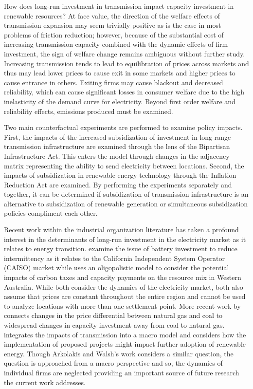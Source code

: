 \documentclass[12pt]{article}
\begin{document}
How does long-run investment in transmission impact capacity investment in renewable resources? At face value, the direction of the welfare effects of transmission expansion may seem trivially positive as is the case in most problems of friction reduction; however, because of the substantial cost of increasing transmission capacity combined with the dynamic effects of firm investment, the sign of welfare change remains ambiguous without further study. Increasing transmission tends to lead to equilibration of prices across markets and thus may lead lower prices to cause exit in some markets and higher prices to cause entrance in others. Exiting firms may cause blackout and decreased reliability, which can cause significant losses in consumer welfare due to the high inelasticity of the demand curve for electricity. Beyond first order welfare and reliability effects, emissions produced must be examined. 

Two main counterfactual experiments are performed to examine policy impacts. First, the impacts of the increased subsidization of investment in long-range transmission infrastructure are examined through the lens of the Bipartisan Infrastructure Act. This enters the model through changes in the adjacency matrix representing the ability to send electricity between locations. Second, the impacts of subsidization in renewable energy technology through the Inflation Reduction Act are examined. By performing the experiments separately and together, it can be determined if subsidization of transmission infrastructure is an alternative to subsidization of renewable generation or simultaneous subsidization policies compliment each other.

Recent work within the industrial organization literature has taken a profound interest in the determinants of long-run investment in the electricity market as it relates to energy transition. \cite{butters2021soaking} examine the issue of battery investment to reduce intermittency as it relates to the California Independent System Operator (CAISO) market while \cite{elliott2022investment} uses an oligopolistic model to consider the potential impacts of carbon taxes and capacity payments on the resource mix in Western Australia. While both consider the dynamics of the electricity market, both also assume that prices are constant throughout the entire region and cannot be used to analyze locations with more than one settlement point.  More recent work by \cite{gowrisankaran2024energy} connects changes in the price differential between natural gas and coal to widespread changes in capacity investment away from coal to natural gas. \cite{arkolakis2023clean} integrates the impacts of transmission into a macro model and considers how the implementation of proposed projects might impact further adoption of renewable energy. Though Arkolakis and Walsh's work considers a similar question, the question is approached from a macro perspective and so, the dynamics of individual firms are neglected providing an important source of future research the current work addresses. 
\end{document}
